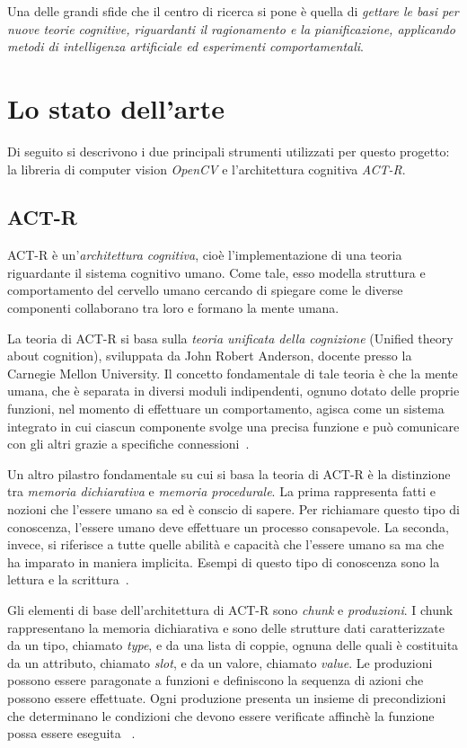 	Una delle grandi sfide che il centro di ricerca si pone è quella di \emph{gettare le basi per nuove teorie cognitive, riguardanti il ragionamento e la pianificazione, applicando metodi di intelligenza artificiale ed esperimenti comportamentali}.

 

	\section*{Lo stato dell'arte}
	Di seguito si descrivono i due principali strumenti utilizzati per questo progetto: la libreria di computer vision \emph{OpenCV} e l'architettura cognitiva \mbox{\emph{ACT-R}}.
		
			\subsection*{ACT-R}
				\mbox{ACT-R} è un'\emph{architettura cognitiva}, cioè l'implementazione di una teoria riguardante il sistema cognitivo umano. Come tale, esso modella struttura e comportamento del cervello umano cercando di spiegare come le diverse componenti collaborano tra loro e formano la mente umana.
				
				La teoria di \mbox{ACT-R} si basa sulla \emph{teoria unificata della cognizione} (Unified theory about cognition), sviluppata da John Robert Anderson, docente presso la Carnegie Mellon University. Il concetto fondamentale di tale teoria è che la mente umana, che è separata in diversi moduli indipendenti, ognuno dotato delle proprie funzioni, nel momento di effettuare un comportamento, agisca come un sistema integrato in cui ciascun componente svolge una precisa funzione e può comunicare con gli altri grazie a specifiche connessioni~\cite{Anderson04anintegrated}.

				Un altro pilastro fondamentale su cui si basa la teoria di \mbox{ACT-R} è la distinzione tra \emph{memoria dichiarativa} e \emph{memoria procedurale}. La prima rappresenta fatti e nozioni che l'essere umano sa ed è conscio di sapere. Per richiamare questo tipo di conoscenza, l'essere umano deve effettuare un processo consapevole. La seconda, invece, si riferisce a tutte quelle abilità e capacità che l'essere umano sa ma che ha imparato in maniera implicita. Esempi di questo tipo di conoscenza sono la lettura e la scrittura~\cite{anderson1976language}. 

				Gli elementi di base dell'architettura di \mbox{ACT-R} sono \emph{chunk} e \emph{produzioni}.
				I chunk rappresentano la memoria dichiarativa e sono delle strutture dati caratterizzate da un tipo, chiamato \emph{type}, e da una lista di coppie, ognuna delle quali è costituita da un attributo, chiamato \emph{slot}, e da un valore, chiamato \emph{value}.
				Le produzioni possono essere paragonate a funzioni e definiscono la sequenza di azioni che possono essere effettuate.
				Ogni produzione presenta un insieme di precondizioni che determinano le condizioni che devono essere verificate affinchè la funzione possa essere eseguita ~\cite{actr6refman}.

